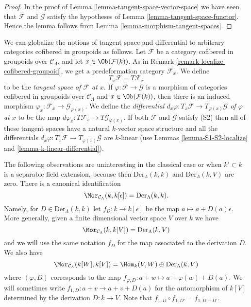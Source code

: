 \begin{proof}
In the proof of
Lemma \ref{lemma-tangent-space-vector-space}
we have seen that $\overline{\mathcal{F}}$ and $\overline{\mathcal{G}}$
satisfy the hypotheses of
Lemma \ref{lemma-tangent-space-functor}.
Hence the lemma follows from
Lemma \ref{lemma-morphism-tangent-spaces}.
\end{proof}

\begin{remark}
\label{remark-tangent-space-cofibered-groupoid}
We can globalize the notions of tangent space and differential to arbitrary
categories cofibered in groupoids as follows. Let $\mathcal{F}$ be a category
cofibered in groupoids over $\mathcal{C}_\Lambda$, and let
$x \in \Ob(\mathcal{F}(k))$. As in
Remark \ref{remark-localize-cofibered-groupoid},
we get a predeformation category $\mathcal{F}_x$. We define
$$
T_x\mathcal{F} = T\mathcal{F}_x
$$
to be the {\it tangent space of $\mathcal{F}$ at $x$}. If
$\varphi : \mathcal{F} \to \mathcal{G}$ is a morphism of categories cofibered
in groupoids over $\mathcal{C}_\Lambda$ and $x \in \Ob(\mathcal{F}(k))$,
then there is an induced morphism
$\varphi_x: \mathcal{F}_x \to \mathcal{G}_{\varphi(x)}$. We define the
{\it differential
$d_x \varphi : T_x \mathcal{F} \to T_{\varphi(x)} \mathcal{G}$
of $\varphi$ at $x$} to be the map
$d \varphi_x: T \mathcal{F}_x \to T \mathcal{G}_{\varphi(x)}$.
If both $\mathcal{F}$ and $\mathcal{G}$ satisfy (S2) then
all of these tangent spaces have a natural $k$-vector space structure
and all the differentials
$d_x \varphi : T_x \mathcal{F} \to T_{\varphi(x)} \mathcal{G}$
are $k$-linear (use
Lemmas \ref{lemma-S1-S2-localize} and \ref{lemma-k-linear-differential}).
\end{remark}

\noindent
The following observations are uninteresting in the classical case or when
$k' \subset k$ is a separable field extension, because then
$\text{Der}_\Lambda(k, k)$ and $\text{Der}_\Lambda(k, V)$ are zero.
There is a canonical identification
$$
\Mor_{\mathcal{C}_\Lambda}(k, k[\epsilon]) =
\text{Der}_\Lambda(k, k).
$$
Namely, for $D \in \text{Der}_\Lambda(k, k)$ let $f_D : k \to k[\epsilon]$
be the map $a \mapsto a + D(a)\epsilon$. More generally, given a finite
dimensional vector space $V$ over $k$ we have
$$
\Mor_{\mathcal{C}_\Lambda}(k, k[V]) =
\text{Der}_\Lambda(k, V)
$$
and we will use the same notation $f_D$ for the map associated to the
derivation $D$. We also have
$$
\Mor_{\mathcal{C}_\Lambda}(k[W], k[V]) =
\Hom_k(V, W) \oplus \text{Der}_\Lambda(k, V)
$$
where $(\varphi, D)$ corresponds to the map
$f_{\varphi, D} : a + w \mapsto a + \varphi(w) + D(a)$. We will sometimes write
$f_{1, D} : a + v \to a + v + D(a)$ for the automorphism
of $k[V]$ determined by the derivation $D : k \to V$. Note that
$f_{1, D} \circ f_{1, D'} = f_{1, D + D'}$.

